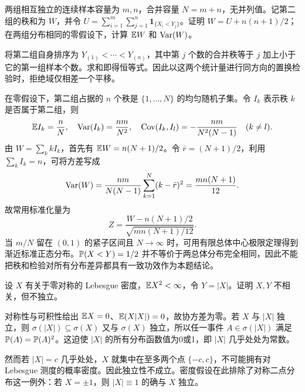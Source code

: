 \begin{example}[原题4：秩和统计量的均值与方差]\label{yau:2012-4}
两组相互独立的连续样本容量为 $m,n$，合并容量 $N=m+n$，无并列值。记第二组的秩和为 $W$，并令 $U=\sum_{i=1}^m\sum_{j=1}^n\mathbf1_{\{X_i<Y_j\}}$。证明 $W=U+n(n+1)/2$；在两组分布相同的零假设下，计算 $\mathbb E W$ 和 $\operatorname{Var}(W)$。
\end{example}
\begin{solve}
将第二组自身排序为 $Y_{(1)}<\cdots<Y_{(n)}$，其中第 $j$ 个数的合并秩等于 $j$ 加上小于它的第一组样本个数。求和即得恒等式。因此以这两个统计量进行同方向的置换检验时，拒绝域仅相差一个平移。

在零假设下，第二组占据的 $n$ 个秩是 $\{1,\ldots,N\}$ 的均匀随机子集。令 $I_k$ 表示秩 $k$ 是否属于第二组，则
\[
\mathbb E I_k=\frac nN,\quad \operatorname{Var}(I_k)=\frac{nm}{N^2},\quad \operatorname{Cov}(I_k,I_l)=-\frac{nm}{N^2(N-1)}\quad(k\ne l).
\]
由 $W=\sum_k kI_k$，首先有 $\mathbb E W=n(N+1)/2$。令 $\bar r=(N+1)/2$，利用 $\sum_k I_k=n$，可将方差写成
\[
\operatorname{Var}(W)=\frac{nm}{N(N-1)}\sum_{k=1}^N(k-\bar r)^2=\frac{mn(N+1)}{12}.
\]
故常用标准化量为
\[
Z=\frac{W-n(N+1)/2}{\sqrt{mn(N+1)/12}}.
\]
当 $m/N$ 留在 $(0,1)$ 的紧子区间且 $N\to\infty$ 时，可用有限总体中心极限定理得到渐近标准正态分布。$\mathbb P(X<Y)=1/2$ 并不等价于两总体分布完全相同，因此不能把秩和检验对所有分布差异都具有一致功效作为本题结论。
\end{solve}

\begin{example}[原题5：不相关但不独立]\label{yau:2012-5}
设 $X$ 有关于零对称的 Lebesgue 密度，$\mathbb E X^2<\infty$，令 $Y=|X|$。证明 $X,Y$ 不相关，但不独立。
\end{example}
\begin{solve}
对称性与可积性给出 $\mathbb E X=0$、$\mathbb E(X|X|)=0$，故协方差为零。若 $X$ 与 $|X|$ 独立，则 $\sigma(|X|)\subseteq\sigma(X)$ 又与 $\sigma(X)$ 独立，所以任一事件 $A\in\sigma(|X|)$ 满足 $\mathbb P(A)=\mathbb P(A)^2$。这迫使 $|X|$ 的所有分布函数值为0或1，即 $|X|$ 几乎处处为常数。

然而若 $|X|=c$ 几乎处处，$X$ 就集中在至多两个点 $\{-c,c\}$，不可能拥有对 Lebesgue 测度的概率密度。因此独立性不成立。密度假设在此排除了对称二点分布这一例外：若 $X=\pm1$，则 $|X|\equiv1$ 的确与 $X$ 独立。
\end{solve}

